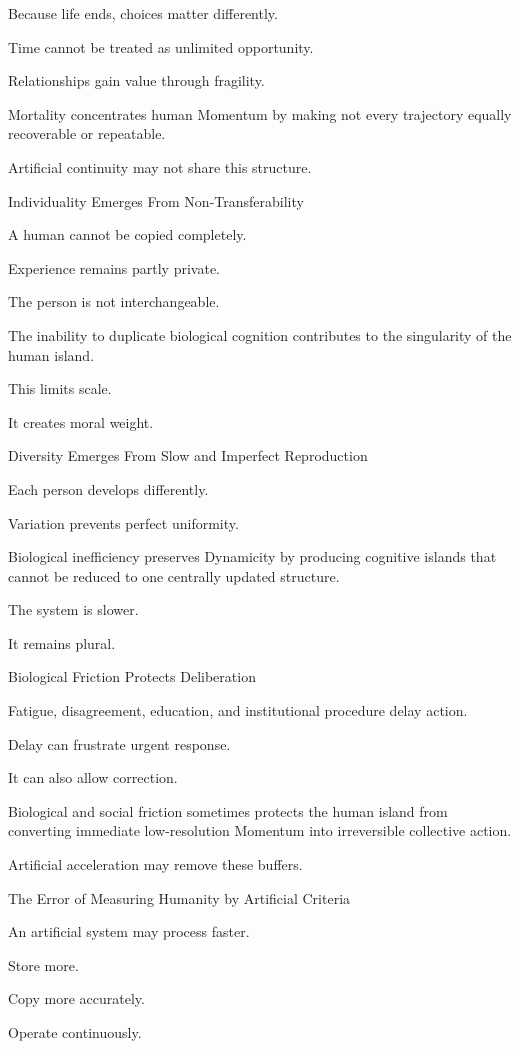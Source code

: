 Because life ends, choices matter differently.

Time cannot be treated as unlimited opportunity.

Relationships gain value through fragility.

Mortality concentrates human Momentum by making not every trajectory equally recoverable or repeatable.

Artificial continuity may not share this structure.

Individuality Emerges From Non-Transferability

A human cannot be copied completely.

Experience remains partly private.

The person is not interchangeable.

The inability to duplicate biological cognition contributes to the singularity of the human island.

This limits scale.

It creates moral weight.

Diversity Emerges From Slow and Imperfect Reproduction

Each person develops differently.

Variation prevents perfect uniformity.

Biological inefficiency preserves Dynamicity by producing cognitive islands that cannot be reduced to one centrally updated structure.

The system is slower.

It remains plural.

Biological Friction Protects Deliberation

Fatigue, disagreement, education, and institutional procedure delay action.

Delay can frustrate urgent response.

It can also allow correction.

Biological and social friction sometimes protects the human island from converting immediate low-resolution Momentum into irreversible collective action.

Artificial acceleration may remove these buffers.

The Error of Measuring Humanity by Artificial Criteria

An artificial system may process faster.

Store more.

Copy more accurately.

Operate continuously.

